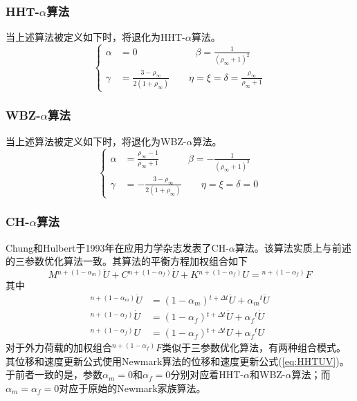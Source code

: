 \subsubsection{HHT-$\alpha$算法}
当上述算法被定义如下时，将退化为HHT-$\alpha$算法。
\begin{equation}
\left\{\begin{aligned}
\alpha&=0\qquad\qquad\qquad\beta=\frac{1}{(\rho_{\infty}+1)^2}\\
\gamma&=\frac{3-\rho_{\infty}}{2(1+\rho_{\infty})}\qquad\eta=\xi=\delta=\frac{\rho_{\infty}}{\rho_{\infty}+1}
\end{aligned}\right.
\end{equation}

\subsubsection{WBZ-$\alpha$算法}
当上述算法被定义如下时，将退化为WBZ-$\alpha$算法。
\begin{equation}
\left\{\begin{aligned}
\alpha&=\frac{\rho_{\infty}-1}{\rho_{\infty}+1}\quad\qquad\beta=-\frac{1}{(\rho_{\infty}+1)^2}\\
\gamma&=-\frac{3-\rho_{\infty}}{2(1+\rho_{\infty})}\qquad\eta=\xi=\delta=0
\end{aligned}\right.
\end{equation}

\subsubsection{CH-$\alpha$算法}
Chung和Hulbert于1993年在应用力学杂志发表了CH-$\alpha$算法\cite{Chung1993a}。该算法实质上与前述的三参数优化算法一致。其算法的平衡方程加权组合如下
\begin{equation}
M{^{n+(1-\alpha_m)}\!\ddot{U}}+C{^{n+(1-\alpha_f)}\!\dot{U}}+K{^{n+(1-\alpha_f)}\!U}={^{n+(1-\alpha_f)}\!F}
\end{equation}
其中
\begin{subequations}
\begin{align}
{^{n+(1-\alpha_m)}\!\ddot{U}}&=(1-\alpha_m){^{t+\Delta t}\!\ddot{U}}+\alpha_m{^t\!\ddot{U}}\\
{^{n+(1-\alpha_f)}\!\dot{U}}&=(1-\alpha_f){^{t+\Delta t}\!\dot{U}}+\alpha_f{^t\!\dot{U}}\\
{^{n+(1-\alpha_f)}\!{U}}&=(1-\alpha_f){^{t+\Delta t}\!{U}}+\alpha_f{^t\!{U}}
\end{align}
\end{subequations}
对于外力荷载的加权组合${^{n+(1-\alpha_f)}\!F}$类似于三参数优化算法，有两种组合模式。其位移和速度更新公式使用Newmark算法的位移和速度更新公式(\ref{eq:HHTUV})。于前者一致的是，参数$\alpha_m=0$和$\alpha_f=0$分别对应着HHT-$\alpha$和WBZ-$\alpha$算法；而$\alpha_m=\alpha_f=0$对应于原始的Newmark家族算法。

